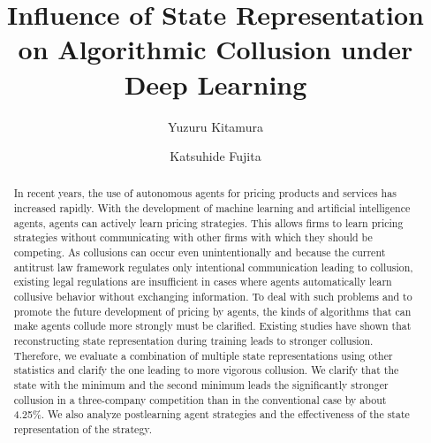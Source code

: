 \documentclass[runningheads]{llncs}
\begin{document}
%
%
\title{Influence of State Representation on Algorithmic Collusion under Deep Learning}
%
%
\author{Yuzuru Kitamura\and
Katsuhide Fujita}
%
%
\maketitle              %

\thispagestyle{empty} %
\pagestyle{empty}  

%
\begin{abstract}
In recent years, the use of autonomous agents for pricing products and services has increased rapidly.
With the development of machine learning and artificial intelligence agents, agents can actively learn pricing strategies.
This allows firms to learn pricing strategies without communicating with other firms with which they should be competing.
As collusions can occur even unintentionally and because the current antitrust law framework regulates only intentional communication leading to collusion, existing legal regulations are insufficient in cases where agents automatically learn collusive behavior without exchanging information.
To deal with such problems and to promote the future development of pricing by agents, the kinds of algorithms that can make agents collude more strongly must be clarified.
Existing studies have shown that reconstructing state representation during training leads to stronger collusion.
Therefore, we evaluate a combination of multiple state representations using other statistics and clarify the one leading to more vigorous collusion.
We clarify that the state with the minimum and the second minimum leads the significantly stronger collusion in a three-company competition than in the conventional case by about 4.25\%.
We also analyze postlearning agent strategies and the effectiveness of the state representation of the strategy.

\end{abstract}
%
%
\end{document}
